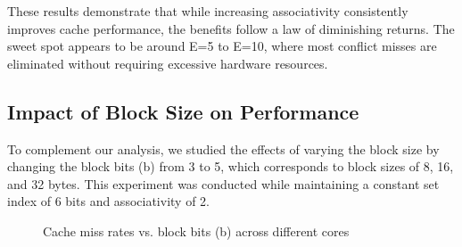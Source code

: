 \documentclass[12pt,a4paper]{article}
\begin{document}
These results demonstrate that while increasing associativity consistently improves cache performance, the benefits follow a law of diminishing returns. The sweet spot appears to be around E=5 to E=10, where most conflict misses are eliminated without requiring excessive hardware resources.

\subsection{Impact of Block Size on Performance}

To complement our analysis, we studied the effects of varying the block size by changing the block bits (b) from 3 to 5, which corresponds to block sizes of 8, 16, and 32 bytes. This experiment was conducted while maintaining a constant set index of 6 bits and associativity of 2.

\begin{figure}[H]
\centering
{}
\caption{Cache miss rates vs. block bits (b) across different cores}
\label{fig:miss_rates_vs_b}
\end{figure}
\end{document}
